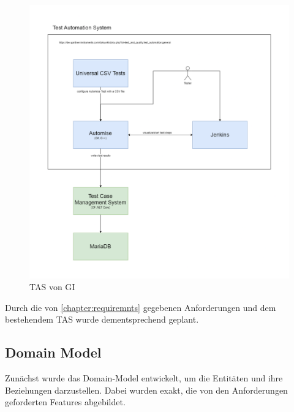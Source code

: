 \documentclass[a4paper, fontsize=11pt, parskip=half, twoside]{scrreprt}
\begin{document}
	\begin{figure}[ht]
		\centering
		\includegraphics[scale=0.3]{assets/TestTechnologiesOverview.drawio.png}
		\caption{\ac{TAS} von \ac{GI}}
		\label{fig:testAutomationSystem}
	\end{figure}

	Durch die von \autoref{chapter:requiremnts} gegebenen Anforderungen und dem bestehendem \ac{TAS} wurde dementsprechend geplant.
	
	\subsection{Domain Model} \label{subsec:domainModel}
	Zunächst wurde das Domain-Model entwickelt, um die Entitäten und ihre Beziehungen darzustellen.
	Dabei wurden exakt, die von den Anforderungen geforderten Features abgebildet.
	
\end{document}
